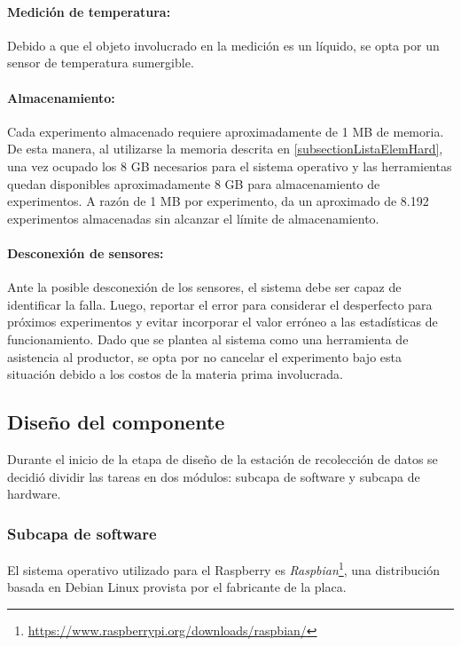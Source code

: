         \paragraph{Medición de temperatura:} 
            Debido a que el objeto involucrado en la medición es un líquido, se opta por un sensor de temperatura sumergible.
    
        \paragraph{Almacenamiento:} 
        Cada experimento almacenado requiere aproximadamente de 1 MB de memoria. De esta manera, al utilizarse la memoria descrita en \ref{subsectionListaElemHard}, una vez ocupado los 8 GB necesarios para el sistema operativo y las herramientas quedan disponibles aproximadamente 8 GB para almacenamiento de experimentos. A razón de 1 MB por experimento, da un aproximado de 8.192 experimentos almacenadas sin alcanzar el límite de almacenamiento. 
        
        \paragraph{Desconexión de sensores:} 
             Ante la posible desconexión de los sensores, el sistema debe ser capaz de identificar la falla. Luego, reportar el error para considerar el desperfecto para próximos experimentos y evitar incorporar el valor erróneo a las estadísticas de funcionamiento. Dado que se plantea al sistema como una herramienta de asistencia al productor, se opta por no cancelar el experimento bajo esta situación debido a los costos de la materia prima involucrada.
            
    \subsection{Diseño del componente}
            \par Durante el inicio de la etapa de diseño de la estación de recolección de datos se decidió dividir las tareas en dos módulos: subcapa de software y subcapa de hardware.
            
            \subsubsection{Subcapa de software}
               \par El sistema operativo utilizado para el Raspberry\textsuperscript{\textregistered} es \textit{Raspbian}\footnote{\url{https://www.raspberrypi.org/downloads/raspbian/}}, una distribución basada en Debian Linux provista por el fabricante de la placa.
                
